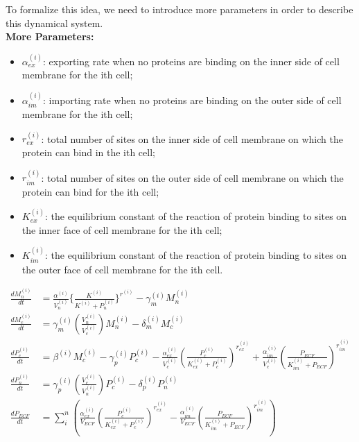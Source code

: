 \documentclass[12pt]{article}
\renewcommand{\(}{\left (}
\renewcommand{\)}{\right )}
\begin{document}
To formalize this idea, we need to introduce more parameters in order to describe this dynamical system. \\

\textbf{\hspace{5mm}More Parameters: \\}
\begin{itemize}
    \item $\alpha_{ex}^{(i)}$: exporting rate when no proteins are binding on the inner side of cell membrane for the ith cell;
    \item $\alpha_{im}^{(i)}$: importing rate when no proteins are binding on the outer side of cell membrane for the ith cell;
    \item $r_{ex}^{(i)}$: total number of sites on the inner side of cell membrane on which the protein can bind in the ith cell;
    \item $r_{im}^{(i)}$: total number of sites on the outer side of cell membrane on which the protein can bind for the ith cell;
    \item $K_{ex}^{(i)}$: the equilibrium constant of the reaction of protein binding to sites on the inner face of cell membrane for the ith cell;
    \item $K_{im}^{(i)}$: the equilibrium constant of the reaction of protein binding to sites on the outer face of cell membrane for the ith cell.
\end{itemize}

\begin{align}
    \frac{dM_n^{(i)}}{dt} &= \frac{\alpha^{(i)}}{V_n^{(i)}} \{\frac{K^{(i)}}{K^{(i)} + P_n^{(i)}}\}^{r^{(i)}} - \gamma_m^{(i)} M_n^{(i)} \\
    \frac{dM_c^{(i)}}{dt} &= \gamma_m^{(i)} (\frac{V_n^{(i)}}{V_c^{(i)}}) M_n^{(i)} - \delta_m^{(i)} M_c^{(i)} \\
    \frac{dP_c^{(i)}}{dt} &= \beta^{(i)} M_c^{(i)} - \gamma_p^{(i)} P_c^{(i)} - \frac{\alpha_{ex}^{(i)}}{V_c^{(i)}} (\frac{P_c^{(i)}}{K_{ex}^{(i)} + P_c^{(i)}})^{r_{ex}^{(i)}} + \frac{\alpha_{im}^{(i)}}{V_c^{(i)}} (\frac{P_{ECF}}{K_{im}^{(i)} + P_{ECF}})^{r_{im}^{(i)}} \\
    \frac{dP_n^{(i)}}{dt} &= \gamma_p^{(i)} (\frac{V_c^{(i)}}{V_n^{(i)}}) P_c^{(i)} - \delta_p^{(i)} P_n^{(i)} \\
    \frac{dP_{ECF}}{dt} &= \sum_i^n (\frac{\alpha_{ex}^{(i)}}{V_{ECF}} (\frac{P_c^{(i)}}{K_{ex}^{(i)} + P_c^{(i)}})^{r_{ex}^{(i)}} - \frac{\alpha_{im}^{(i)}}{V_{ECF}} (\frac{P_{ECF}}{K_{im}^{(i)} + P_{ECF}})^{r_{im}^{(i)}})
\end{align}
\end{document}
